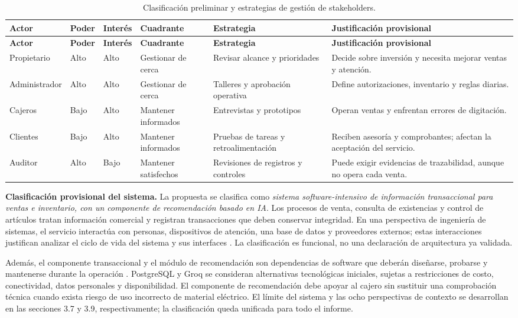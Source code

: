 \documentclass[onecolumn,12pt,a4paper]{IEEEtran}
\begin{document}
\small
\begin{longtable}{@{}p{2.3cm}p{1.0cm}p{1.0cm}p{2.3cm}p{3.0cm}p{4.6cm}@{}}
\caption{Clasificación preliminar y estrategias de gestión de stakeholders.}\label{tab:stakeholders}\\
\toprule
\textbf{Actor} & \textbf{Poder} & \textbf{Interés} & \textbf{Cuadrante} & \textbf{Estrategia} & \textbf{Justificación provisional}\\\midrule
\endfirsthead
\toprule
\textbf{Actor} & \textbf{Poder} & \textbf{Interés} & \textbf{Cuadrante} & \textbf{Estrategia} & \textbf{Justificación provisional}\\\midrule
\endhead
Propietario & Alto & Alto & Gestionar de cerca & Revisar alcance y prioridades & Decide sobre inversión y necesita mejorar ventas y atención.\\
Administrador & Alto & Alto & Gestionar de cerca & Talleres y aprobación operativa & Define autorizaciones, inventario y reglas diarias.\\
Cajeros & Bajo & Alto & Mantener informados & Entrevistas y prototipos & Operan ventas y enfrentan errores de digitación.\\
Clientes & Bajo & Alto & Mantener informados & Pruebas de tareas y retroalimentación & Reciben asesoría y comprobantes; afectan la aceptación del servicio.\\
Auditor & Alto & Bajo & Mantener satisfechos & Revisiones de registros y controles & Puede exigir evidencias de trazabilidad, aunque no opera cada venta.\\
\bottomrule
\end{longtable}
\normalsize

\textbf{Clasificación provisional del sistema.} La propuesta se clasifica como \emph{sistema software-intensivo de información transaccional para ventas e inventario, con un componente de recomendación basado en IA}. Los procesos de venta, consulta de existencias y control de artículos tratan información comercial y registran transacciones que deben conservar integridad. En una perspectiva de ingeniería de sistemas, el servicio interactúa con personas, dispositivos de atención, una base de datos y proveedores externos; estas interacciones justifican analizar el ciclo de vida del sistema y sus interfaces \cite{iso15288,pohl2025}. La clasificación es funcional, no una declaración de arquitectura ya validada.

Además, el componente transaccional y el módulo de recomendación son dependencias de software que deberán diseñarse, probarse y mantenerse durante la operación \cite{iso12207,iso15288}. PostgreSQL y Groq se consideran alternativas tecnológicas iniciales, sujetas a restricciones de costo, conectividad, datos personales y disponibilidad. El componente de recomendación debe apoyar al cajero sin sustituir una comprobación técnica cuando exista riesgo de uso incorrecto de material eléctrico. El límite del sistema y las ocho perspectivas de contexto se desarrollan en las secciones 3.7 y 3.9, respectivamente; la clasificación queda unificada para todo el informe.
\end{document}
